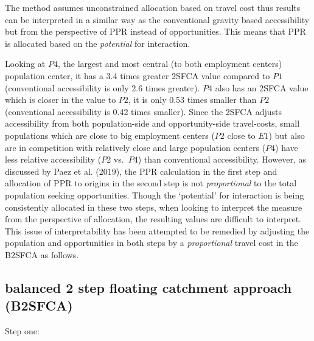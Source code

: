 \documentclass[]{elsarticle} %
\begin{document}
The method assumes unconstrained allocation based on travel cost thus
results can be interpreted in a similar way as the conventional gravity
based accessibility but from the perspective of PPR instead of
opportunities. This means that PPR is allocated based on the
\emph{potential} for interaction.

Looking at \(P4\), the largest and most central (to both employment
centers) population center, it has a 3.4 times greater 2SFCA value
compared to \(P1\) (conventional accessibility is only 2.6 times
greater). \(P4\) also has an 2SFCA value which is closer in the value to
\(P2\), it is only 0.53 times smaller than \(P2\) (conventional
accessibility is 0.42 times smaller). Since the 2SFCA adjusts
accessibility from both population-side and opportunity-side
travel-costs, small populations which are close to big employment
centers (\(P2\) close to \(E1\)) but also are in competition with
relatively close and large population centers (\(P4\)) have less
relative accessibility (\(P2\) vs.~\(P4\)) than conventional
accessibility. However, as discussed by Paez et al. (2019), the PPR
calculation in the first step and allocation of PPR to origins in the
second step is not \emph{proportional} to the total population seeking
opportunities. Though the `potential' for interaction is being
consistently allocated in these two steps, when looking to interpret the
measure from the perspective of allocation, the resulting values are
difficult to interpret. This issue of interpretability has been
attempted to be remedied by adjusting the population and opportunities
in both steps by a \emph{proportional} travel cost in the B2SFCA as
follows.

\hypertarget{balanced-2-step-floating-catchment-approach-b2sfca}{%
\subsection{balanced 2 step floating catchment approach
(B2SFCA)}\label{balanced-2-step-floating-catchment-approach-b2sfca}}

Step one:
\end{document}
